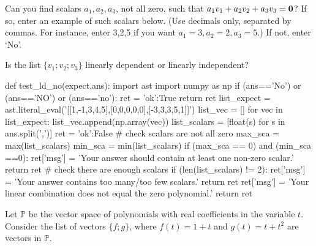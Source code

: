 Can you find scalars $a_1, a_2, a_3$, not all zero, such that 
$a_1v_1 + a_2 v_2 + a_3 v_3 = \mathbf{0}$?  If so, enter an example of such scalars below.  (Use decimals only, separated by commas.  For instance, enter 3,2,5 if you want $a_1 = 3, a_2=2, a_3=5$.)
If not, enter `No'.  



Is the list $\{v_1; v_2; v_3\}$ linearly dependent or linearly independent?  



\endedxproblem







\begin{edXscript}

def test_ld_no(expect,ans):
    import ast
    import numpy as np 
    if (ans=='No') or (ans=='NO') or (ans=='no'):
        ret = {'ok':True}
        return ret    
    list_expect = ast.literal_eval('[[1,-1,3,4,5],[0,0,0,0,0],[-3,3,3,5,1]]')
    list_vec = []
    for vec in list_expect:
        list_vec.append(np.array(vec))
    list_scalars = [float(s) for s in ans.split(',')]
    ret = {'ok':False}
    # check scalars are not all zero
    max_sca = max(list_scalars)
    min_sca = min(list_scalars)
    if (max_sca == 0) and (min_sca ==0):
        ret['msg'] = 'Your answer should contain at least one non-zero scalar.'
        return ret
    # check there are enough scalars
    if (len(list_scalars) != 2):
        ret['msg'] = 'Your answer contains too many/too few scalars.'
        return ret    
    ret['msg'] = 'Your linear combination does not equal the zero polynomial.'
    return ret  
\end{edXscript}

Let $\mathbb{P}$ be the vector space of polynomials with real coefficients in the variable $t$.  
Consider the list of vectors $\{f; g\}$, where $f(t) = 1+t$ and $g(t) = t+t^2$ are
vectors in $\mathbb{P}$.

